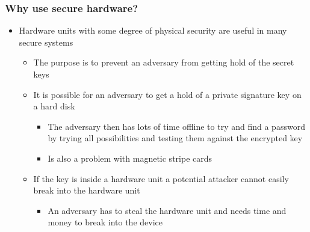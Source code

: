 \documentclass[11pt]{article}
\begin{document}
\subsubsection{Why use secure hardware?}
\label{sec:orge24920c}
\begin{itemize}
\item Hardware units with some degree of physical security are useful in many secure systems
\begin{itemize}
\item The purpose is to prevent an adversary from getting hold of the secret keys
\item It is possible for an adversary to get a hold of a private signature key on a hard disk
\begin{itemize}
\item The adversary then has lots of time offline to try and find a password by trying all possibilities and testing them against the encrypted key
\item Is also a problem with magnetic stripe cards
\end{itemize}
\item If the key is inside a hardware unit a potential attacker cannot easily break into the hardware unit
\begin{itemize}
\item An adversary has to steal the hardware unit and needs time and money to break into the device
\end{itemize}
\end{itemize}
\end{itemize}
\end{document}
